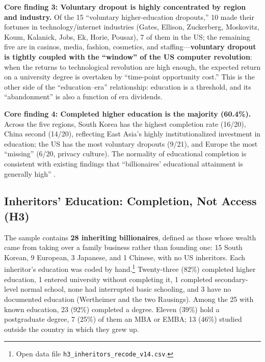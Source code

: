 \documentclass[11pt,a4paper]{article}
\begin{document}
\textbf{Core finding 3: Voluntary dropout is highly concentrated by region and industry.} Of the 15 ``voluntary higher-education dropouts,'' 10 made their fortunes in technology/internet industries (Gates, Ellison, Zuckerberg, Moskovitz, Koum, Kalanick, Jobs, Ek, Horie, Pousaz), 7 of them in the US; the remaining five are in casinos, media, fashion, cosmetics, and staffing---\textbf{voluntary dropout is tightly coupled with the ``window'' of the US computer revolution}: when the returns to technological revolution are high enough, the expected return on a university degree is overtaken by ``time-point opportunity cost.'' This is the other side of the ``education--era'' relationship: education is a threshold, and its ``abandonment'' is also a function of era dividends.

\textbf{Core finding 4: Completed higher education is the majority (60.4\%).} Across the five regions, South Korea has the highest completion rate (16/20), China second (14/20), reflecting East Asia's highly institutionalized investment in education; the US has the most voluntary dropouts (9/21), and Europe the most ``missing'' (6/20, privacy culture). The normality of educational completion is consistent with existing findings that ``billionaires' educational attainment is generally high'' \citep{lillie2025,wai2013}.

\subsection{Inheritors' Education: Completion, Not Access (H3)}

The sample contains \textbf{28 inheriting billionaires}, defined as those whose wealth came from taking over a family business rather than founding one: 15 South Korean, 9 European, 3 Japanese, and 1 Chinese, with no US inheritors. Each inheritor's education was coded by hand.\footnote{Open data file \texttt{h3\_inheritors\_recode\_v14.csv}.} Twenty-three (82\%) completed higher education, 1 entered university without completing it, 1 completed secondary-level normal school, none had interrupted basic schooling, and 3 have no documented education (Wertheimer and the two Rausings). Among the 25 with known education, 23 (92\%) completed a degree. Eleven (39\%) hold a postgraduate degree, 7 (25\%) of them an MBA or EMBA; 13 (46\%) studied outside the country in which they grew up.
\end{document}
